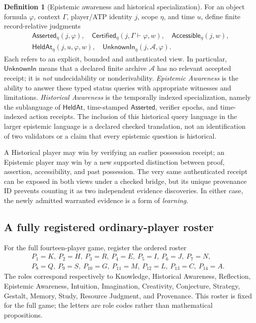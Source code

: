 \documentclass[11pt,letterpaper]{article}
\theoremstyle{definition}
\newtheorem{definition}{Definition}[section]
\theoremstyle{plain}
\theoremstyle{definition}
\begin{document}
\begin{definition}[Epistemic awareness and historical specialization]
For an object formula $\varphi$, context $\Gamma$, player/ATP identity $j$, scope $\eta$, and time $u$, define finite record-relative judgments
\[\begin{aligned}
 &\mathsf{Asserted}_\eta(j,\varphi),\quad\mathsf{Certified}_\eta(j,\Gamma\vdash\varphi,w),\quad\mathsf{Accessible}_\eta(j,w),\\
 &\mathsf{HeldAt}_\eta(j,u,\varphi,w),\quad\mathsf{UnknownIn}_\eta(j,\mathcal A,\varphi).
\end{aligned}\]
Each refers to an explicit, bounded and authenticated view. In particular, \(\mathsf{UnknownIn}\) means that a declared finite archive $\mathcal A$ has no relevant accepted receipt; it is \emph{not} undecidability or nonderivability. \emph{Epistemic Awareness} is the ability to answer these typed status queries with appropriate witnesses and limitations. \emph{Historical Awareness} is the temporally indexed specialization, namely the sublanguage of \(\mathsf{HeldAt}\), time-stamped \(\mathsf{Asserted}\), verifier epochs, and time-indexed action receipts. The inclusion of this historical query language in the larger epistemic language is a declared checked translation, not an identification of two validators or a claim that every epistemic question is historical.

A Historical player may win by verifying an earlier possession receipt; an Epistemic player may win by a new supported distinction between proof, assertion, accessibility, and past possession. The very same authenticated receipt can be exposed in both views under a checked bridge, but its unique provenance ID prevents counting it as two independent evidence discoveries. In either case, the newly admitted warranted evidence is a form of \emph{learning}.
\end{definition}

\subsection{A fully registered ordinary-player roster}
For the full fourteen-player game, register the ordered roster
\[
\begin{gathered}
P_1=K,\ P_2=H,\ P_3=R,\ P_4=E,\ P_5=I,\ P_6=J,\ P_7=N,\\
P_8=Q,\ P_9=S,\ P_{10}=G,\ P_{11}=M,\ P_{12}=L,\ P_{13}=C,\ P_{14}=A.
\end{gathered}
\]
The roles correspond respectively to Knowledge, Historical Awareness, Reflection, Epistemic Awareness, Intuition, Imagination, Creativity, Conjecture, Strategy, Gestalt, Memory, Study, Resource Judgment, and Provenance. This roster is fixed for the full game; the letters are role codes rather than mathematical propositions.
\end{document}
